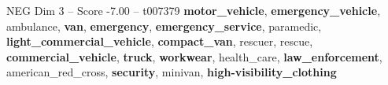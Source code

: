 \begin{textsample}{NEG Dim 3 – Score -7.00 – t007379}  \label{ex:f3_neg_014}
\textbf{motor\_vehicle}, \textbf{emergency\_vehicle}, ambulance, \textbf{van}, \textbf{emergency}, \textbf{emergency\_service}, paramedic, \textbf{light\_commercial\_vehicle}, \textbf{compact\_van}, rescuer, rescue, \textbf{commercial\_vehicle}, \textbf{truck}, \textbf{workwear}, health\_care, \textbf{law\_enforcement}, american\_red\_cross, \textbf{security}, minivan, \textbf{high-visibility\_clothing}

\end{textsample}
